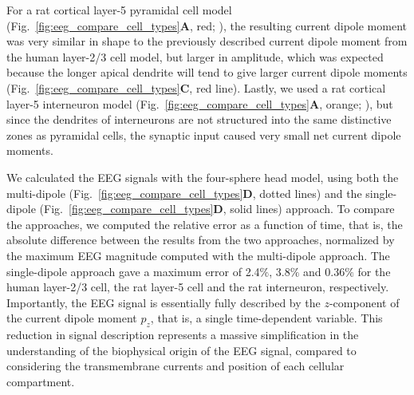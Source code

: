\documentclass[preprint,10pt,authoryear]{elsarticle}
\newcommand{\newtxt}[1]{{\color{Red}#1}}
\begin{document}
For a rat cortical layer-5 pyramidal cell model (Fig.~\ref{fig:eeg_compare_cell_types}\textbf{A}, \newtxt{red}; \cite{HAY2011}), the resulting current dipole moment was very similar in shape \newtxt{to the previously described current dipole moment from the human layer-2/3 cell model, }but larger in amplitude, which was expected because the longer apical dendrite will tend to give larger current dipole moments (Fig.~\ref{fig:eeg_compare_cell_types}\textbf{C}, \newtxt{red} line).
Lastly, we used a rat cortical layer-5 interneuron model (Fig.~\ref{fig:eeg_compare_cell_types}\textbf{A}, \newtxt{orange}; \cite{MARKRAM2015}), but since the dendrites of interneurons are not structured into the same distinctive zones as pyramidal cells, the synaptic input caused very small net current dipole moments.

We calculated the EEG signals with the four-sphere head model, using both the multi-dipole (Fig.~\ref{fig:eeg_compare_cell_types}\textbf{D}, dotted lines) and the single-dipole (Fig.~\ref{fig:eeg_compare_cell_types}\textbf{D}, solid lines) approach.
To compare the approaches, we computed the relative error \newtxt{as a function of} time, that is, the absolute difference between the results from the two approaches, normalized by the maximum EEG magnitude computed with the multi-dipole approach.
The single-dipole approach gave a maximum 
error of  2.4$\%$, 3.8$\%$ and 0.36$\%$ for the human layer-2/3 cell, the rat layer-5 cell and the rat interneuron, respectively.
Importantly, the EEG signal is essentially fully described by the $z$-component of the current dipole moment $p_z$, that is, a single time-dependent variable. This reduction in signal description represents a massive simplification in the understanding of the biophysical origin of the EEG signal, compared to considering the transmembrane currents and position of each cellular compartment. 
\end{document}
